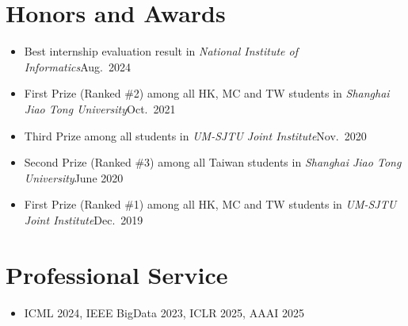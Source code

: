 \documentclass[letterpaper,10.8pt]{article}
\begin{document}
\section{Honors and Awards}
\begin{itemize}
      \item {}
            {Best internship evaluation result in \emph{National Institute of Informatics}}{Aug.\ 2024}

      \item {}
            {First Prize (Ranked \#2) among all HK, MC and TW students in \emph{Shanghai Jiao Tong University}}{Oct.\ 2021}

      \item {}
            {Third Prize among all students in \emph{UM-SJTU Joint Institute}}{Nov.\ 2020}

      \item {}
            {Second Prize (Ranked \#3) among all Taiwan students in \emph{Shanghai Jiao Tong University}}{June 2020}

      \item {}
            {First Prize (Ranked \#1) among all HK, MC and TW students in \emph{UM-SJTU Joint Institute}}{Dec.\ 2019}
\end{itemize}

\section{Professional Service}
\begin{itemize}
      \item {}
            {ICML 2024, IEEE BigData 2023, ICLR 2025, AAAI 2025}{}
\end{itemize}
\end{document}
